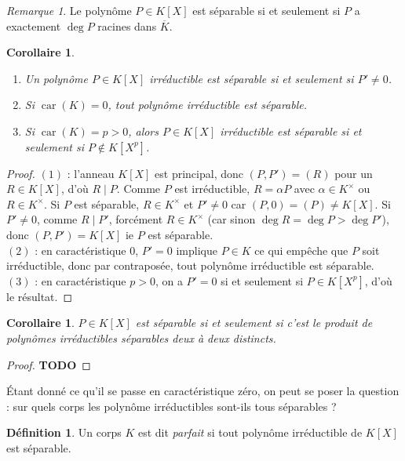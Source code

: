 \documentclass{article}
\DeclareMathOperator{\car}{car}
\newcommand{\todo}{\textbf{TODO}}
\theoremstyle{plain}
\newtheorem{corollary}[theorem]{Corollaire}
\theoremstyle{definition}
\newtheorem{definition}[theorem]{Définition}
\theoremstyle{remark}
\newtheorem*{remark}{Remarque}
\begin{document}
\begin{remark}
    Le polynôme $P \in K[X]$ est séparable si et seulement si $P$ a exactement $\deg P$ racines dans $\overline{K}$.
\end{remark}

\begin{corollary} \leavevmode
    \begin{enumerate}
        \item Un polynôme $P \in K[X]$ irréductible est séparable si et seulement si $P' \ne 0$.
        \item Si $\car (K) = 0$, tout polynôme irréductible est séparable.
        \item Si $\car(K) = p > 0$, alors $P \in K[X]$ irréductible est séparable si et seulement si $P \notin K[X^p]$.
    \end{enumerate}
\end{corollary}

\begin{proof}
    $(1)$ : l'anneau $K[X]$ est principal, donc $(P,P') = (R)$ pour un $R \in K[X]$, d'où $R \mid P$. Comme $P$ est irréductible, $R = \alpha P$ avec $\alpha \in K^\times$ ou $R \in K^\times$. Si $P$ est séparable, $R \in K^\times$ et $P' \ne 0$ car $(P,0) = (P) \ne K[X]$. Si $P' \ne 0$, comme $R \mid P'$, forcément $R \in K^\times$ (car sinon $\deg R = \deg P > \deg P'$), donc $(P,P') = K[X]$ ie $P$ est séparable. \\
    $(2)$ : en caractéristique $0$, $P' = 0$ implique $P \in K$ ce qui empêche que $P$ soit irréductible, donc par contraposée, tout polynôme irréductible est séparable.
    $(3)$ : en caractéristique $p > 0$, on a $P' = 0$ si et seulement si $P \in K[X^p]$, d'où le résultat.
\end{proof}

\begin{corollary}
    $P \in K[X]$ est séparable si et seulement si c'est le produit de polynômes irréductibles séparables deux à deux distincts.
\end{corollary}

\begin{proof}
    \todo
\end{proof}

Étant donné ce qu'il se passe en caractéristique zéro, on peut se poser la question : sur quels corps les polynôme irréductibles sont-ils tous séparables ?

\begin{definition}
    Un corps $K$ est dit \emph{parfait} si tout polynôme irréductible de $K[X]$ est séparable.
\end{definition}
\end{document}

